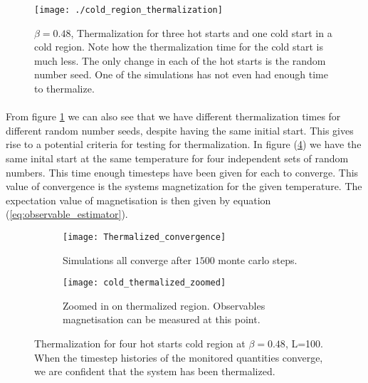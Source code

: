 \documentclass[12pt] {report} %
\begin{document}
			
				\begin{figure}[H]
					\centering
					\texttt{[image: ./cold\_region\_thermalization]}
					\caption{$\beta=0.48$, Thermalization for three hot starts and one cold start in a cold region. Note how the thermalization time for the cold start is much less. The only change in each of the hot starts is the random number seed. One of the simulations has not even had enough time to thermalize.}
					\label{fig:cold_region_thermalization}
				\end{figure}
		
				\paragraph{}
					From figure \ref{fig:cold_region_thermalization} we can also see that we have different thermalization times for different random number seeds, despite having the same initial start. This gives rise to a potential criteria for testing for thermalization. In figure (\ref{fig:thermalize_method_1}) we have the same inital start at the same temperature for four independent sets of random numbers. This time enough timesteps have been given for each to converge. This value of convergence is the systems magnetization for the given temperature. The expectation value of magnetisation is then given by equation (\ref{eq:observable_estimator}).
					
				
				\begin{figure}[H]
					\centering
					\begin{subfigure}[h]{0.49\textwidth}
					\centering
						\texttt{[image: Thermalized\_convergence]}
						\caption{Simulations all converge after $1500$ monte carlo steps.}
						\label{fig:cold_start_thermalization}
					\end{subfigure}
					\hfill
					\begin{subfigure}[h]{0.49\textwidth}
						\centering
							\texttt{[image: cold\_thermalized\_zoomed]}
							\caption{Zoomed in on thermalized region. Observables magnetisation can be measured at this point.}
							\label{fig:cold_thermalized_zoomed}
					\end{subfigure} 
					\caption{Thermalization for four hot starts cold region at $\beta=0.48$, L=100. When the timestep
					histories of the monitored quantities converge, we are confident that the
					system has been thermalized.}
					\label{fig:thermalize_method_1}
				\end{figure}				
		
\end{document}
